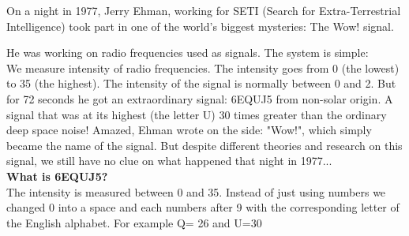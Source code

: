 \begin{tcolorbox}[colback=green!5,colframe=green!40!black,title=The wow! signal: Our first Extra-Terrestrial communication?]

On a night in 1977, Jerry Ehman, working for SETI (Search for Extra-Terrestrial Intelligence) took part in one of the world's biggest mysteries: The Wow! signal.

He was working on radio frequencies used as signals. The system is simple:\\

We measure intensity of radio frequencies. The intensity goes from 0 (the lowest) to 35 (the highest).  The intensity of the signal is normally between 0 and 2. But for 72 seconds he got an extraordinary signal: 6EQUJ5 from non-solar origin. A signal that was at its highest (the letter U) 30 times greater than the ordinary deep space noise! Amazed, Ehman wrote on the side: "Wow!", which simply became the name of the signal. But despite different theories and research on this signal, we still have no clue on what happened that night in 1977... \\

\textbf{What is 6EQUJ5?} \\

The intensity is measured between 0 and 35. Instead of just using numbers we changed 0 into a space and each numbers after 9 with the corresponding letter of the English alphabet. For example Q= 26 and U=30
\end{tcolorbox}